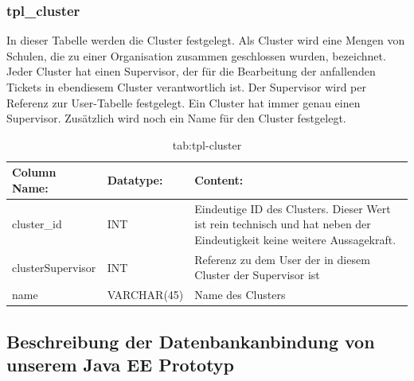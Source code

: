 \newpage

\subsubsection{tpl\_cluster}

In dieser Tabelle werden die Cluster festgelegt. Als Cluster wird eine Mengen von Schulen, die zu einer Organisation zusammen geschlossen wurden, bezeichnet. Jeder Cluster hat einen Supervisor, der für die Bearbeitung der anfallenden Tickets in ebendiesem Cluster verantwortlich ist.
Der Supervisor wird per Referenz zur User-Tabelle festgelegt. Ein Cluster hat immer genau einen Supervisor. Zusätzlich wird noch ein Name für den Cluster festgelegt.



\begin{table}[h]
	\begin{tabular}{|p{3.5cm}|p{4cm}|p{6.2cm}|}
		\hline
		\textbf{Column Name:} & \textbf{Datatype:} & \textbf{Content:}\\
		\hline
		cluster\_id & INT & Eindeutige ID des Clusters. Dieser Wert ist rein technisch und hat neben der Eindeutigkeit keine weitere Aussagekraft.\\
		\hline
		clusterSupervisor & INT & Referenz zu dem User der in diesem Cluster der Supervisor ist\\
		\hline
		name & VARCHAR(45) & Name des Clusters\\
		\hline
	\end{tabular}
	\caption{tab:tpl-cluster}
\end{table}
\label{tab:tpl_cluster}

\newpage

\subsection{Beschreibung der Datenbankanbindung von unserem Java EE Prototyp}

